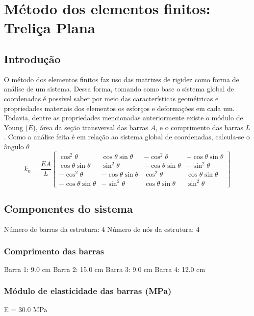 \documentclass{article}%
\begin{document}
%
\normalsize%
\section{Método dos elementos finitos: Treliça Plana}%
\label{sec:MtododoselementosfinitosTreliaPlana}%
\subsection{Introdução}%
\label{subsec:Introduo}%
O método dos elementos finitos faz uso das matrizes de rigidez como forma de análise de um sistema. Dessa forma, tomando como base o sistema global de coordenadas é possível saber por meio das características geométricas e propriedades materiais dos elementos os esforços e deformações em cada um. Todavia, dentre as propriedades mencionadas anteriormente existe o módulo de Young ($E$), área da seção transversal das barras $A$, e o comprimento das barras $L$. Como a análise feita é em relação ao sistema global de coordenadas, calcula-se o ângulo $\theta$%
\[%
k_{n}=\dfrac{EA}{L} \begin{bmatrix}%
\cos^2\theta&\cos\theta\sin\theta&-\cos^2\theta&-\cos\theta\sin\theta\\%
\cos\theta\sin\theta&\sin^2\theta&-\cos\theta\sin\theta&-\sin^2\theta\\%
-\cos^2\theta&-\cos\theta\sin\theta&\cos^2\theta&\cos\theta\sin\theta\\%
-\cos\theta\sin\theta&-\sin^2\theta&\cos\theta\sin\theta&\sin^2\theta%
\end{bmatrix}%
\]

%
\subsection{Componentes do sistema}%
\label{subsec:Componentesdosistema}%
Número de barras da estrutura: 4\newline%
%
Número de nós da estrutura: 4%
\subsubsection{Comprimento das barras}%
\label{ssubsec:Comprimentodasbarras}%
Barra 1: 9.0 cm\newline%
%
Barra 2: 15.0 cm\newline%
%
Barra 3: 9.0 cm\newline%
%
Barra 4: 12.0 cm

%
\subsubsection{Módulo de elasticidade das barras (MPa)}%
\label{ssubsec:Mdulodeelasticidadedasbarras(MPa)}%
E = 30.0 MPa
\end{document}
